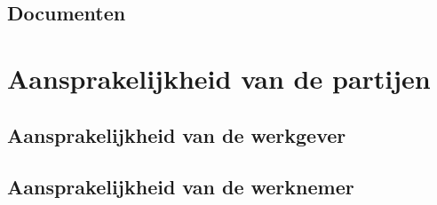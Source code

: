 \subsection{Documenten}

\section{Aansprakelijkheid van de partijen}

\subsection{Aansprakelijkheid van de werkgever}

\subsection{Aansprakelijkheid van de werknemer}



